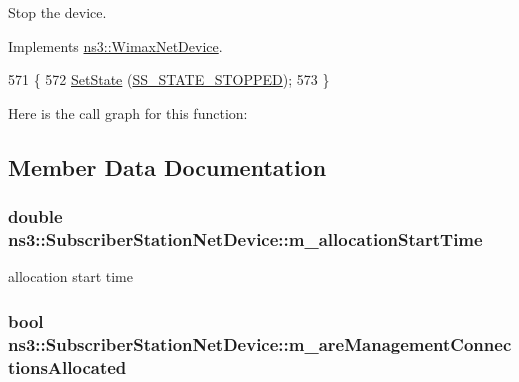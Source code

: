 Stop the device. 



Implements \hyperlink{classns3_1_1WimaxNetDevice_a443e4444e9e13ddd4cef5a7093082d60}{ns3\+::\+Wimax\+Net\+Device}.


\begin{DoxyCode}
571 \{
572   \hyperlink{classns3_1_1WimaxNetDevice_a6f3df9f6d5c94c02e7ecab21bfab2fce}{SetState} (\hyperlink{classns3_1_1SubscriberStationNetDevice_af9f145bc05df1f18610a3d4b61ff9ee4a22e031574426ab38a8038231746ac57a}{SS\_STATE\_STOPPED});
573 \}
\end{DoxyCode}


Here is the call graph for this function\+:




\subsection{Member Data Documentation}
\subsubsection[{\texorpdfstring{m\+\_\+allocation\+Start\+Time}{m_allocationStartTime}}]{\setlength{\rightskip}{0pt plus 5cm}double ns3\+::\+Subscriber\+Station\+Net\+Device\+::m\+\_\+allocation\+Start\+Time\hspace{0.3cm}{\ttfamily [private]}}\hypertarget{classns3_1_1SubscriberStationNetDevice_a2cb4adc0ed8b698b828e86b8575fb9ee}{}\label{classns3_1_1SubscriberStationNetDevice_a2cb4adc0ed8b698b828e86b8575fb9ee}


allocation start time 

\subsubsection[{\texorpdfstring{m\+\_\+are\+Management\+Connections\+Allocated}{m_areManagementConnectionsAllocated}}]{\setlength{\rightskip}{0pt plus 5cm}bool ns3\+::\+Subscriber\+Station\+Net\+Device\+::m\+\_\+are\+Management\+Connections\+Allocated\hspace{0.3cm}{\ttfamily [private]}}\hypertarget{classns3_1_1SubscriberStationNetDevice_a601bcf0cd57f6d9f0b112e9c9afc23e7}{}\label{classns3_1_1SubscriberStationNetDevice_a601bcf0cd57f6d9f0b112e9c9afc23e7}


